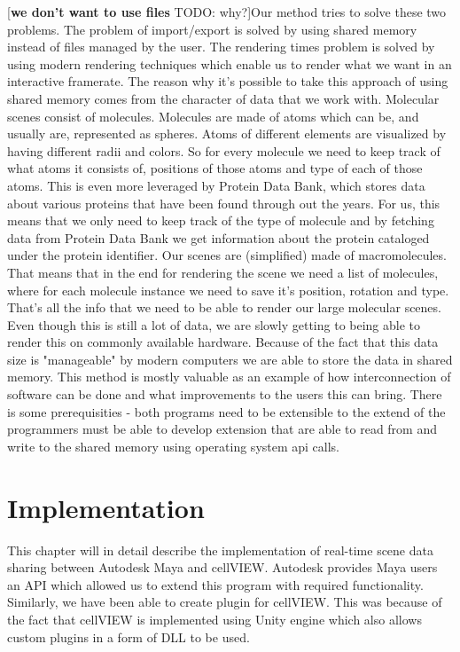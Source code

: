 \documentclass[
  digital, %
  table,   %
  nolof,     %
  nolot,     %
]{fithesis3}
\begin{document}
[\textbf{we don't want to use files} TODO: why?]Our method tries to solve these two problems. The problem of import/export is solved by using shared memory instead of files managed by the user. The rendering times problem is solved by using modern rendering techniques which enable us to render what we want in an interactive framerate.
The reason why it's possible to take this approach of using shared memory comes from the character of data that we work with. Molecular scenes consist of molecules. Molecules are made of atoms which can be, and usually are, represented as spheres. Atoms of different elements are visualized by having different radii and colors. So for every molecule we need to keep track of what atoms it consists of, positions of those atoms and type of each of those atoms. This is even more leveraged by Protein Data Bank, which stores data about various proteins that have been found through out the years. For us, this means that we only need to keep track of the type of molecule and by fetching data from Protein Data Bank we get information about the protein cataloged under the protein identifier. Our scenes are (simplified) made of macromolecules. That means that in the end for rendering the scene we need a list of molecules, where for each molecule instance we need to save it's position, rotation and type. That's all the info that we need to be able to render our large molecular scenes. Even though this is still a lot of data, we are slowly getting to being able to render this on commonly available hardware. Because of the fact that this data size is "manageable" by modern computers we are able to store the data in shared memory.
This method is mostly valuable as an example of how interconnection of software can be done and what improvements to the users this can bring. There is some prerequisities - both programs need to be extensible to the extend of the programmers must be able to develop extension that are able to read from and write to the shared memory using operating system api calls.

\chapter{Implementation}

This chapter will in detail describe the implementation of real-time scene data sharing between Autodesk Maya and cellVIEW. Autodesk provides Maya users an API which allowed us to extend this program with required functionality. Similarly, we have been able to create plugin for cellVIEW. This was because of the fact that cellVIEW is implemented using Unity engine which also allows custom plugins in a form of DLL to be used.
\end{document}
